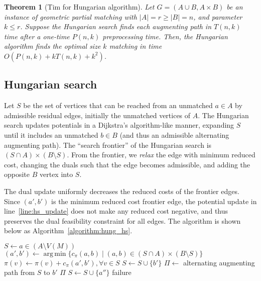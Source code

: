 \documentclass[11pt]{article}
\makeatletter
\DeclareMathOperator*{\argmin}{arg\,min}
\theoremstyle{plain}
\newtheorem{theorem}{Theorem}
\def\n@te#1{\textsf{\boldmath \textbf{$\langle\!\langle$#1$\rangle\!\rangle$}}\leavevmode}
\def\note#1{\textcolor{red}{\n@te{#1}}}
\makeatother
\begin{document}
\begin{theorem}[Tim for Hungarian algorithm]
\label{theorem:hung_orig}
Let $G = (A \cup B, A \times B)$ be an instance of geometric partial matching
with $|A| = r \geq |B| = n$, and parameter $k \leq r$.
Suppose the Hungarian search finds each augmenting path in $T(n, k)$ time after
a one-time $P(n, k)$ preprocessing time.
Then, the Hungarian algorithm finds the optimal size $k$ matching in time
$O(P(n, k) + k T(n, k) + k^2)$.
\end{theorem}

\subsection{Hungarian search}

Let $S$ be the set of vertices that can be reached from an unmatched $a \in A$
by admissible residual edges, initially the unmatched vertices of $A$.
The Hungarian search updates potentials in a Dijkstra's algorithm-like manner,
expanding $S$ until it includes an unmatched $b \in B$ (and thus an admissible
alternating augmenting path).
The ``search frontier'' of the Hungarian search is
$(S \cap A) \times (B \setminus S)$.
From the frontier, we \emph{relax} the edge with minimum reduced cost, changing
the duals such that the edge becomes admissible, and adding the opposite $B$
vertex into $S$.

The dual update uniformly decreases the reduced costs of the frontier edges.
Since $(a', b')$ is the minimum reduced cost frontier edge, the potential
update in line~\ref{line:hs_update} does not make any reduced cost negative,
and thus preserves the dual feasibility constraint for all edges.
The algorithm is shown below as Algorithm~\ref{algorithm:hung_hs}.

\begin{figure*}
\centering
\begin{minipage}{.8\linewidth}
\begin{algorithm}[H]
\caption{Hungarian Search (matching)}
\label{algorithm:hung_hs}
\begin{algorithmic}[1]
	\State $S \gets a \in (A \setminus V(M))$
	\Repeat
		\State $(a', b') \gets \argmin\{c_\pi(a, b) \mid (a, b) \in (S \cap A) \times (B \setminus S)\}$
		\State $\pi(v) \gets \pi(v) + c_\pi(a', b'), \forall v \in S$
			\label{line:hs_update}
		\State $S \gets S \cup \{b'\}$
		 
			\State $\Pi \gets$ alternating augmenting path from $S$ to $b'$
			\State\Return $\Pi$
		\Else {}
			\State $S \gets S \cup \{a''\}$
		\EndIf
	\State\Return failure
\EndFunction
\end{algorithmic}
\end{algorithm}
\end{minipage}
\end{figure*}
\end{document}
